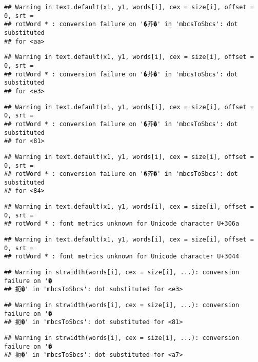 \documentclass[]{article}
\begin{document}
\begin{verbatim}
## Warning in text.default(x1, y1, words[i], cex = size[i], offset = 0, srt =
## rotWord * : conversion failure on '�芥�' in 'mbcsToSbcs': dot substituted
## for <aa>
\end{verbatim}

\begin{verbatim}
## Warning in text.default(x1, y1, words[i], cex = size[i], offset = 0, srt =
## rotWord * : conversion failure on '�芥�' in 'mbcsToSbcs': dot substituted
## for <e3>
\end{verbatim}

\begin{verbatim}
## Warning in text.default(x1, y1, words[i], cex = size[i], offset = 0, srt =
## rotWord * : conversion failure on '�芥�' in 'mbcsToSbcs': dot substituted
## for <81>
\end{verbatim}

\begin{verbatim}
## Warning in text.default(x1, y1, words[i], cex = size[i], offset = 0, srt =
## rotWord * : conversion failure on '�芥�' in 'mbcsToSbcs': dot substituted
## for <84>
\end{verbatim}

\begin{verbatim}
## Warning in text.default(x1, y1, words[i], cex = size[i], offset = 0, srt =
## rotWord * : font metrics unknown for Unicode character U+306a
\end{verbatim}

\begin{verbatim}
## Warning in text.default(x1, y1, words[i], cex = size[i], offset = 0, srt =
## rotWord * : font metrics unknown for Unicode character U+3044
\end{verbatim}

\begin{verbatim}
## Warning in strwidth(words[i], cex = size[i], ...): conversion failure on '�
## 扼�' in 'mbcsToSbcs': dot substituted for <e3>
\end{verbatim}

\begin{verbatim}
## Warning in strwidth(words[i], cex = size[i], ...): conversion failure on '�
## 扼�' in 'mbcsToSbcs': dot substituted for <81>
\end{verbatim}

\begin{verbatim}
## Warning in strwidth(words[i], cex = size[i], ...): conversion failure on '�
## 扼�' in 'mbcsToSbcs': dot substituted for <a7>
\end{verbatim}
\end{document}
